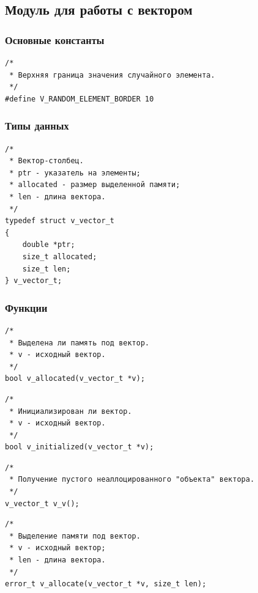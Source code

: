 \documentclass[a4paper,12pt]{extarticle}
\begin{document}
 \vspace{0.5cm}

\subsection{Модуль для работы с вектором}
\subsubsection{Основные константы}
\begin{verbatim}
/*
 * Верхняя граница значения случайного элемента.
 */
#define V_RANDOM_ELEMENT_BORDER 10
\end{verbatim}




\subsubsection{Типы данных}
\begin{verbatim}
/*
 * Вектор-столбец.
 * ptr - указатель на элементы;
 * allocated - размер выделенной памяти;
 * len - длина вектора.
 */
typedef struct v_vector_t
{
    double *ptr;
    size_t allocated;
    size_t len;
} v_vector_t;
\end{verbatim}




\subsubsection{Функции}
\begin{verbatim}
/*
 * Выделена ли память под вектор.
 * v - исходный вектор.
 */
bool v_allocated(v_vector_t *v);
\end{verbatim}


 \vspace{0.5cm}

\begin{verbatim}
/*
 * Инициализирован ли вектор.
 * v - исходный вектор.
 */
bool v_initialized(v_vector_t *v);
\end{verbatim}


 \vspace{0.5cm}

\begin{verbatim}
/*
 * Получение пустого неаллоцированного "объекта" вектора.
 */
v_vector_t v_v();
\end{verbatim}


 \vspace{0.5cm}

\begin{verbatim}
/*
 * Выделение памяти под вектор.
 * v - исходный вектор;
 * len - длина вектора.
 */
error_t v_allocate(v_vector_t *v, size_t len);
\end{verbatim}
\end{document}
